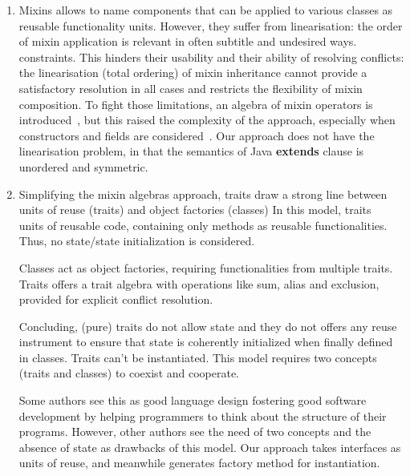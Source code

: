 \begin{enumerate}
\item Mixins allows to name components that can be applied to various classes as
  reusable functionality units. However, they suffer from linearisation: the
  order of mixin application is relevant in often subtitle and undesired
  ways. constraints. This hinders their usability and their ability of resolving
  conflicts: the linearisation (total ordering) of mixin inheritance cannot
  provide a satisfactory resolution in all cases and restricts the flexibility
  of mixin composition.  To fight those limitations, an algebra of mixin
  operators is introduced~\cite{ancona2002calculus}, but this raised the
  complexity of the approach, especially when constructors and fields are
  considered~\cite{marco09FJigsaw}.  Our approach does not have the
  linearisation problem, in that the semantics of Java \textbf{extends} clause
  is unordered and symmetric.
\item Simplifying the mixin algebras approach, traits draw a strong line between
  units of reuse (traits) and object factories (classes) In this model,
  traits~\cite{scharli03traits} units of reusable code, containing only methods
  as reusable functionalities. Thus, no state/state initialization is
  considered.

  Classes act as object factories, requiring functionalities from multiple
  traits.  Traits offers a trait algebra with operations like sum, alias and
  exclusion, provided for explicit conflict resolution.

  Concluding, (pure) traits do not allow state and they do not offers any reuse
  instrument to ensure that state is coherently initialized when finally defined
  in classes.  Traits can't be instantiated. This model requires two concepts
  (traits and classes) to coexist and cooperate.

  Some authors see this as good language design fostering good software
  development by helping programmers to think about the structure of their
  programs.  However, other authors see the need of two concepts and the absence
  of state as drawbacks of this model. Our approach takes interfaces as units of
  reuse, and meanwhile generates factory method for instantiation.


\end{enumerate}
